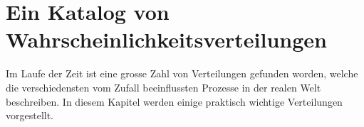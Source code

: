 
%
%
%
\chapter{Ein Katalog von Wahrscheinlichkeitsverteilungen}
\label{chapter:wahrscheinlichkeitsverteilung-katalog}
Im Laufe der Zeit ist eine grosse Zahl von Verteilungen gefunden worden,
welche die verschiedensten vom Zufall beeinflussten Prozesse in der realen
Welt beschreiben.
In diesem Kapitel werden einige praktisch wichtige Verteilungen vorgestellt.




